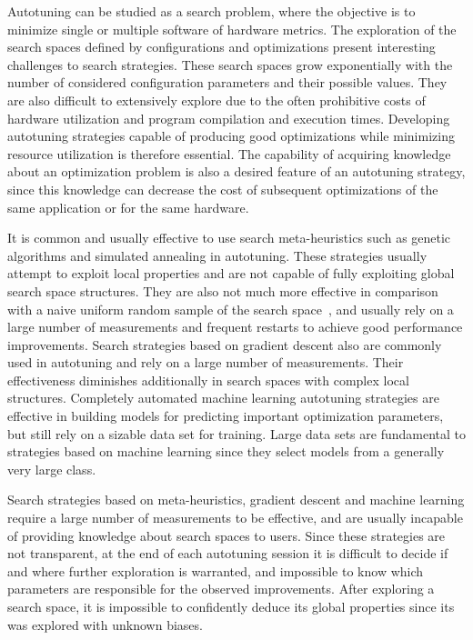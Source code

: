 \documentclass[conference]{IEEEtran}
\begin{document}
Autotuning can be studied as a search problem, where the objective is to
minimize single or multiple software of hardware metrics. The exploration of the
search spaces defined by configurations and optimizations present interesting
challenges to search strategies. These search spaces grow exponentially with the
number of considered configuration parameters and their possible values. They
are also difficult to extensively explore due to the often prohibitive costs of
hardware utilization and program compilation and execution times. Developing
autotuning strategies capable of producing good optimizations while minimizing
resource utilization is therefore essential. The capability of acquiring
knowledge about an optimization problem is also a desired feature of an
autotuning strategy, since this knowledge can decrease the cost of subsequent
optimizations of the same application or for the same hardware.

It is common and usually effective to use search meta-heuristics such as genetic
algorithms and simulated annealing in autotuning. These strategies usually
attempt to exploit local properties and are not capable of fully exploiting
global search space structures. They are also not much more effective in
comparison with a naive uniform random sample of the search
space~\cite{seymour2008comparison,knijnenburg2003combined}, and usually rely on a
large number of measurements and frequent restarts to achieve good performance
improvements. Search strategies based on gradient descent also are commonly used
in autotuning and rely on a large number of measurements. Their effectiveness
diminishes additionally in search spaces with complex local structures.
Completely automated machine learning autotuning strategies are effective in
building models for predicting important optimization parameters, but still rely
on a sizable data set for training. Large data sets are fundamental to
strategies based on machine learning since they select models from a generally
very large class.

Search strategies based on meta-heuristics, gradient descent and machine
learning require a large number of measurements to be effective, and are usually
incapable of providing knowledge about search spaces to users. Since these
strategies are not transparent, at the end of each autotuning session it is
difficult to decide if and where further exploration is warranted, and
impossible to know which parameters are responsible for the observed
improvements. After exploring a search space, it is impossible to confidently
deduce its global properties since its was explored with unknown biases.
\end{document}
